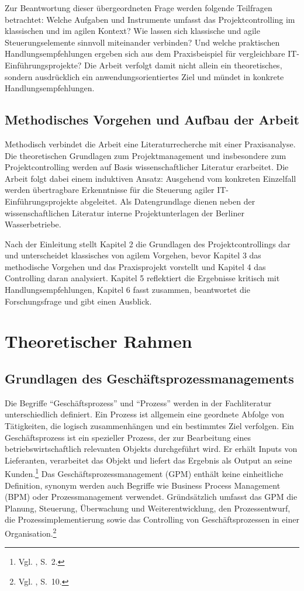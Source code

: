 \documentclass[
    12pt, 
    a4paper,
    ]{scrartcl} %
\begin{document}
Zur Beantwortung dieser übergeordneten Frage werden folgende Teilfragen betrachtet: Welche Aufgaben und Instrumente umfasst das Projektcontrolling im klassischen und im agilen Kontext? Wie lassen sich klassische und agile Steuerungselemente sinnvoll miteinander verbinden? Und welche praktischen Handlungsempfehlungen ergeben sich aus dem Praxisbeispiel für vergleichbare IT-Einführungsprojekte? Die Arbeit verfolgt damit nicht allein ein theoretisches, sondern ausdrücklich ein anwendungsorientiertes Ziel und mündet in konkrete Handlungsempfehlungen.

\subsection{Methodisches Vorgehen und Aufbau der Arbeit}
Methodisch verbindet die Arbeit eine Literaturrecherche mit einer Praxisanalyse. Die theoretischen Grundlagen zum Projektmanagement und insbesondere zum Projektcontrolling werden auf Basis wissenschaftlicher Literatur erarbeitet. Die Arbeit folgt dabei einem induktiven Ansatz: Ausgehend vom konkreten Einzelfall werden übertragbare Erkenntnisse für die Steuerung agiler IT-Einführungsprojekte abgeleitet. Als Datengrundlage dienen neben der wissenschaftlichen Literatur interne Projektunterlagen der Berliner Wasserbetriebe.

Nach der Einleitung stellt Kapitel 2 die Grundlagen des Projektcontrollings dar und unterscheidet klassisches von agilem Vorgehen, bevor Kapitel 3 das methodische Vorgehen und das Praxisprojekt vorstellt und Kapitel 4 das Controlling daran analysiert. Kapitel 5 reflektiert die Ergebnisse kritisch mit Handlungsempfehlungen, Kapitel 6 fasst zusammen, beantwortet die Forschungsfrage und gibt einen Ausblick. 

\section{Theoretischer Rahmen}

\subsection{Grundlagen des Geschäftsprozessmanagements}
Die Begriffe \enquote{Geschäftsprozess} und \enquote{Prozess} werden in der Fachliteratur unterschiedlich definiert. Ein Prozess ist allgemein eine geordnete Abfolge von Tätigkeiten, die logisch zusammenhängen und ein bestimmtes Ziel verfolgen. Ein Geschäftsprozess ist ein spezieller Prozess, der zur Bearbeitung eines betriebswirtschaftlich relevanten Objekts durchgeführt wird. Er erhält Inputs von Lieferanten, verarbeitet das Objekt und liefert das Ergebnis als Output an seine Kunden.\footnote{Vgl. \cite{Koch_Geschaeftsprozessmanagement}, S.~2.} Das Geschäftsprozessmanagement (GPM) enthält keine einheitliche Definition, synonym werden auch Begriffe wie Business Process Management (BPM) oder Prozessmanagement verwendet. Gründsätzlich umfasst das GPM die Planung, Steuerung, Überwachung und Weiterentwicklung, den Prozessentwurf, die Prozessimplementierung sowie das Controlling von Geschäftsprozessen in einer Organisation.\footnote{Vgl. \cite{Koch_Geschaeftsprozessmanagement}, S.~10.}
\end{document}
